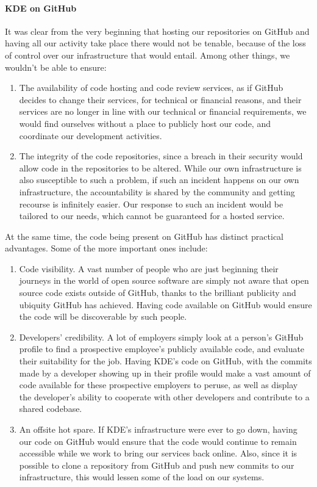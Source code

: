 \paragraph{KDE on GitHub}
It was clear from the very beginning that hosting our repositories on GitHub and having all our activity take place there would not be tenable, because of the loss of control over our infrastructure that would entail. Among other things, we wouldn’t be able to ensure:
\begin{enumerate}
 \item The availability of code hosting and code review services, as if GitHub decides to change their services, for technical or financial reasons, and their services are no longer in line with our technical or financial requirements, we would find ourselves without a place to publicly host our code, and coordinate our development activities.
 \item The integrity of the code repositories, since a breach in their security would allow code in the repositories to be altered. While our own infrastructure is also susceptible to such a problem, if such an incident happens on our own infrastructure, the accountability is shared by the community and getting recourse is infinitely easier. Our response to such an incident would be tailored to our needs, which cannot be guaranteed for a hosted service.
\end{enumerate}
At the same time, the code being present on GitHub has distinct practical advantages. Some of the more important ones include:
\begin{enumerate}
 \item Code visibility. A vast number of people who are just beginning their journeys in the world of open source software are simply not aware that open source code exists outside of GitHub, thanks to the brilliant publicity and ubiquity GitHub has achieved. Having code available on GitHub would ensure the code will be discoverable by such people.
 \item Developers’ credibility. A lot of employers simply look at a person’s GitHub profile to find a prospective employee’s publicly available code, and evaluate their suitability for the job. Having KDE’s code on GitHub, with the commits made by a developer showing up in their profile would make a vast amount of code available for these prospective employers to peruse, as well as display the developer’s ability to cooperate with other developers and contribute to a shared codebase.
 \item An offsite hot spare. If KDE’s infrastructure were ever to go down, having our code on GitHub would ensure that the code would continue to remain accessible while we work to bring our services back online. Also, since it is possible to clone a repository from GitHub and push new commits to our infrastructure, this would lessen some of the load on our systems.
\end{enumerate}

